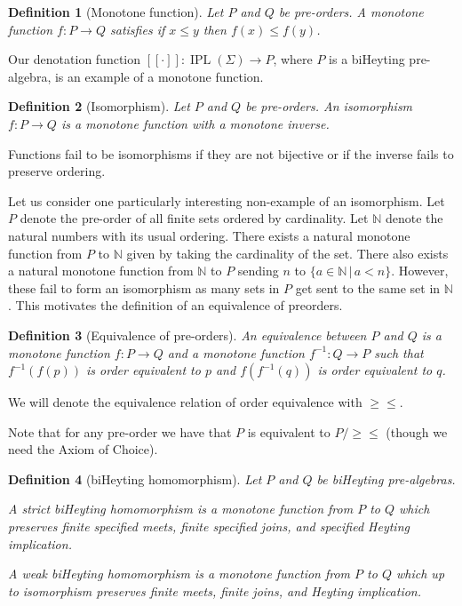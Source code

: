 \documentclass[12pt]{article}
\newtheorem{definition}{Definition}
\newcommand{\N}{\mathbb{N}}
\DeclareMathOperator{\IPL}{IPL}
\begin{document}
\begin{definition}[Monotone function]
    Let $P$ and $Q$ be pre-orders. A monotone function $f: P \to Q$ satisfies if $x \le y$ then $f(x) \le f(y)$.
\end{definition}

\noindent Our denotation function $[[\cdot]]: \IPL(\Sigma) \to P$, where $P$ is a biHeyting pre-algebra, is an example of a monotone function. 

\begin{definition}[Isomorphism]
    Let $P$ and $Q$ be pre-orders. An isomorphism $f: P \to Q$ is a monotone function with a monotone inverse. 
\end{definition}

\noindent Functions fail to be isomorphisms if they are not bijective or if the inverse fails to preserve ordering.  


Let us consider one particularly interesting non-example of an isomorphism. Let $P$ denote the pre-order of all finite sets ordered by cardinality. Let $\N$ denote the natural numbers with its usual ordering. There exists a natural monotone function from $P$ to $\N$ given by taking the cardinality of the set. There also exists a natural monotone function from $\N$ to $P$ sending $n$ to $\{a \in \N \, | \, a < n\}$. However, these fail to form an isomorphism as many sets in $P$ get sent to the same set in $\N$. This motivates the definition of an equivalence of preorders.

\begin{definition}[Equivalence of pre-orders]
    An equivalence between $P$ and $Q$ is a monotone function $f: P \to Q$ and a monotone function $f^{-1}: Q \to P$ such that $f^{-1}(f(p))$ is order equivalent to $p$ and $f(f^{-1}(q))$ is order equivalent to $q$.
\end{definition}

\noindent We will denote the equivalence relation of order equivalence with $\ge\le$.


Note that for any pre-order we have that $P$ is equivalent to $P / \ge\le$ (though we need the Axiom of Choice).

\begin{definition}[biHeyting homomorphism]
    Let $P$ and $Q$ be biHeyting pre-algebras. 
    
    A strict biHeyting homomorphism is a monotone function from $P$ to $Q$ which preserves finite specified meets, finite specified joins, and specified Heyting implication. 
    
    A weak biHeyting homomorphism is a monotone function from $P$ to $Q$ which up to isomorphism preserves finite meets, finite joins, and Heyting implication.
\end{definition}
\end{document}
